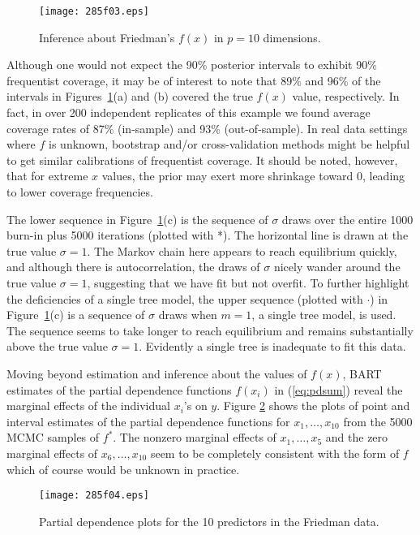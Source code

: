 \documentclass[aoas,nameyear,dvips]{arximspdf}
\begin{document}
\begin{figure}[b]

\texttt{[image: 285f03.eps]}

 \caption{Inference about Friedman's $f(x)$ in $p=10$ dimensions.}\label{fig:friedman}
\end{figure}

Although one would not expect the 90\% posterior intervals to exhibit
90\% frequentist coverage, it may be of interest to note that 89\%
and 96\% of the intervals in Figures~\ref{fig:friedman}(a) and (b)
covered the true $f(x)$ value, respectively.   In fact, in over
200 independent replicates of this example we found average
coverage rates of  87\% (in-sample) and 93\% (out-of-sample).
In real data settings where $f$ is unknown,
bootstrap and/or cross-validation methods might be helpful to get similar
calibrations of frequentist coverage. It should be
noted, however, that for extreme $x$ values, the prior may exert more shrinkage toward 0, leading
to lower coverage frequencies.


The lower sequence in Figure~\ref{fig:friedman}(c) is the sequence
of $\sigma$ draws over the entire 1000 burn-in plus 5000
iterations (plotted with *). The horizontal line is drawn at the
true value $\sigma = 1$. The Markov chain here appears to reach
equilibrium quickly, and although there is autocorrelation, the
draws of $\sigma$ nicely wander around the true value $\sigma = 1$,
suggesting that we have fit but not overfit.   To further
highlight the deficiencies of a single tree model, the upper
sequence (plotted with $\cdot$) in Figure~\ref{fig:friedman}(c) is
a sequence of $\sigma$ draws when $m =1$, a single tree model, is used.  The sequence
seems to take longer to reach equilibrium and remains
substantially above the true value $\sigma = 1$.  Evidently a
single tree is inadequate to fit this data.

Moving beyond estimation and inference about the values of $f(x)$, BART
estimates of the partial dependence functions $f(x_i)$ in
(\ref{eq:pdsum}) reveal the marginal effects of the individual $x_i$'s
on $y$. Figure \ref{fig:friedman-pdplot} shows the plots of point and
interval estimates of the partial dependence functions for
$x_1,\ldots,x_{10}$  from the 5000 MCMC samples of $f^*$.  The nonzero
marginal effects of $x_1,\ldots,x_5$ and the zero marginal effects of
$x_6,\ldots,x_{10}$ seem to be completely consistent with the form of
$f$ which of course would be unknown in practice.

\begin{figure}[b]

\texttt{[image: 285f04.eps]}

\caption{Partial dependence plots for the 10 predictors in the Friedman data.}\label{fig:friedman-pdplot}
\end{figure}
\end{document}
